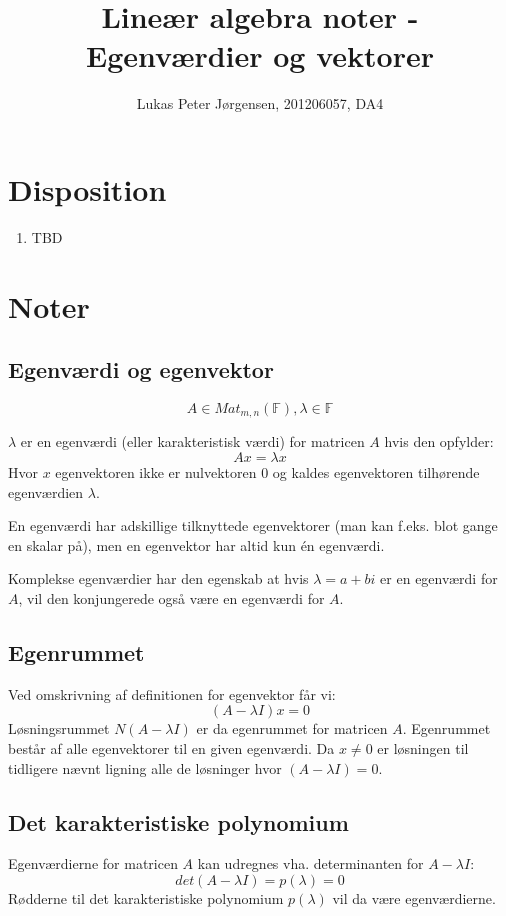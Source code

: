 \documentclass[a4paper,oneside,article]{memoir}
\begin{document}
    \title{Lineær algebra noter - Egenværdier og vektorer}
    \author{Lukas Peter Jørgensen, 201206057, DA4
            }
    \maketitle
    
    \tableofcontents
        
    \chapter{Disposition}
    \begin{enumerate}
    \item TBD
    \end{enumerate}
    
	\chapter{Noter}
	
	\section{Egenværdi og egenvektor}
	$$A\in Mat_{m,n}(\mathbb{F}), \lambda \in \mathbb{F}$$
	
	$\lambda$ er en egenværdi (eller karakteristisk værdi) for matricen 
	$A$ hvis den opfylder:
	$$Ax=\lambda x$$
	Hvor $x$ egenvektoren ikke er nulvektoren $0$ og kaldes egenvektoren 
	tilhørende egenværdien $\lambda$.
	
	En egenværdi har adskillige tilknyttede egenvektorer (man kan f.eks. 
	blot gange en skalar på), men en egenvektor har altid kun én egenværdi. 
	
	Komplekse egenværdier har den egenskab at hvis $\lambda = a+bi$ er en
	egenværdi for $A$, vil den konjungerede også være en egenværdi for $A$.
	
	\section{Egenrummet}
	Ved omskrivning af definitionen for egenvektor får vi:
	$$(A-\lambda I)x=0$$
	Løsningsrummet $N(A-\lambda I)$ er da egenrummet for matricen $A$. 
	Egenrummet består af alle egenvektorer til en given egenværdi. Da $x\neq 0$
	er løsningen til tidligere nævnt ligning alle de løsninger hvor 
	$(A-\lambda I)=0$.
	
	\section{Det karakteristiske polynomium}
	Egenværdierne for matricen $A$ kan udregnes vha. determinanten for 
	$A-\lambda I$:
	$$det(A-\lambda I)=p(\lambda)=0$$
	Rødderne til det karakteristiske polynomium $p(\lambda)$ vil da være 
	egenværdierne.
	
\end{document}
